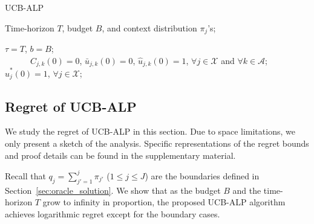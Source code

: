 \begin{algorithm}[htbp]
\caption{UCB-ALP}
\label{alg:ucb_alp}
\begin{algorithmic}
 Time-horizon $T$, budget $B$, and context distribution $\pi_j$'s;

 $\tau = T$, $b = B$; \\
~~~~~~$C_{j,k}(0) = 0$, $\bar{u}_{j,k}(0) = 0$, $\hat{u}_{j,k}(0) = 1$, $\forall j \in \mathcal{X}$ and $\forall k\in \mathcal{A}$; $\hat{u}^*_{j}(0) = 1$, $\forall j \in \mathcal{X}$;

\ENDIF
{}
\ENDFOR
\end{algorithmic}
\end{algorithm}
\vspace{-0.2cm}


\subsection{Regret of UCB-ALP}
We study the regret of UCB-ALP in this section. Due to space limitations, we only present a sketch of the analysis. Specific representations of the regret bounds and proof details can be found in the supplementary material.

Recall that $q_j = \sum_{j'=1}^j \pi_{j'}$ ($1 \leq j \leq J$) are the boundaries defined in Section~\ref{sec:oracle_solution}.
We show that as the budget $B$ and the time-horizon $T$ grow to infinity in proportion, the proposed UCB-ALP algorithm achieves logarithmic regret except for the boundary cases.

